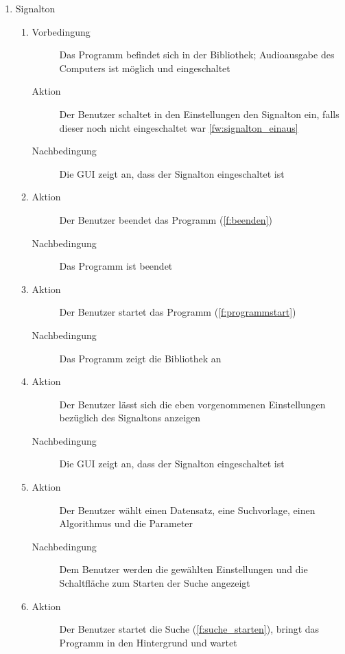 \begin{enumerate} [label=\bfseries /TSW \arabic*0/, leftmargin=*]
	\item Signalton
	\begin{enumerate}
		\item
		\begin{description}
			\item[Vorbedingung] Das Programm befindet sich in der Bibliothek; Audioausgabe des Computers ist möglich und eingeschaltet
			\item[Aktion] Der Benutzer schaltet in den Einstellungen den Signalton ein, falls dieser noch nicht eingeschaltet war \ref{fw:signalton_einaus}
			\item[Nachbedingung] Die GUI zeigt an, dass der Signalton eingeschaltet ist
		\end{description}
		\item
		\begin{description}
			\item[Aktion] Der Benutzer beendet das Programm (\ref{f:beenden})
			\item[Nachbedingung] Das Programm ist beendet
		\end{description}
		\item
		\begin{description}
			\item[Aktion] Der Benutzer startet das Programm (\ref{f:programmstart})
			\item[Nachbedingung] Das Programm zeigt die Bibliothek an
		\end{description}
		\item
		\begin{description}
			\item[Aktion] Der Benutzer lässt sich die eben vorgenommenen Einstellungen bezüglich des Signaltons anzeigen
			\item[Nachbedingung] Die GUI zeigt an, dass der Signalton eingeschaltet ist
		\end{description}
		\item
		\begin{description}
			\item[Aktion] Der Benutzer wählt einen Datensatz, eine Suchvorlage, einen Algorithmus und die Parameter
			\item[Nachbedingung] Dem Benutzer werden die gewählten Einstellungen und die Schaltfläche zum Starten der Suche angezeigt
		\end{description}
		\item
		\begin{description}
			\item[Aktion] Der Benutzer startet die Suche (\ref{f:suche_starten}), bringt das Programm in den Hintergrund und wartet

\end{description}
\end{enumerate}
\end{enumerate}
